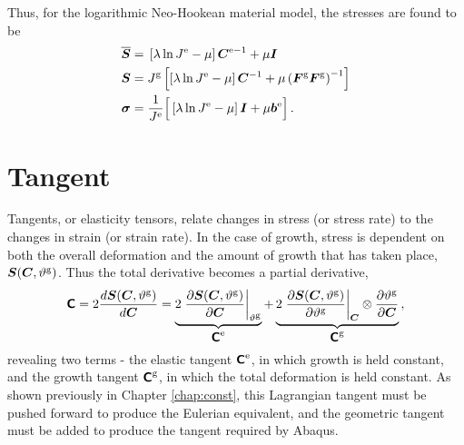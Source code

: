 \documentclass[10pt,letterpaper,oneside]{report}
\newcommand{\ten}[1]{\mbox{\boldmath $#1$}{}}
\newcommand{\tenf}[1]{\mbox{{\sffamily{\bfseries {#1}}}}}
\newcommand{\scas}[1]{\mbox{{\scriptsize{${\rm{#1}}$}}}{}}
\newcommand{\tens}[1]{\mbox{\boldmath{\scriptsize{$#1$}}}{}}
\begin{document}
\begin{itemize}
Thus, for the logarithmic Neo-Hookean material model, the stresses are found to be
\begin{align}
\overline{\ten{S}} ={}& \left[ \lambda \ln J^{\scas{e}} - \mu \right] \ten{C}^{\scas{e}-1} + \mu \ten{I} 
\\
\ten{S} ={}& J^{\scas{g}} \left[ \left[ \lambda \ln J^{\scas{e}} - \mu \right] \ten{C}^{-1} + \mu \left( \ten{F}^{\scas{g}} \ten{F}^{\scas{g}} \right)^{-1} \right] 
\\
\ten{\sigma} ={}& \frac{1}{J^{\scas{e}}} \Big[ \left[ \lambda \ln J^{\scas{e}} - \mu \right] \ten{I} + \mu \ten{b}^{\scas{e}} \Big] \, . 
\end{align}


\section{Tangent}
Tangents, or elasticity tensors, relate changes in stress (or stress rate) to the changes in strain (or strain rate).  In the case of growth, stress is dependent on both the overall deformation and the amount of growth that has taken place,
$\ten{S} (\ten{C}, \vartheta^{\scas{g}}) $. Thus the total derivative becomes a partial derivative, 
\begin{equation}
\tenf{C} = 2 \frac{d \ten{S} (\ten{C}, \vartheta^{\scas{g}}) }{d \ten{C} } 
= \underbrace{ 2 \left. \frac{ \partial \ten{S} (\ten{C}, \vartheta^{\scas{g}}) }{ \partial \ten{C} } \right|_{\vartheta^{\scas{g}}} }_{ \tenf{C}^{\scas{e}} } + \underbrace{ 2 \left. \frac{\partial \ten{S} (\ten{C}, \vartheta^{\scas{g}}) }{\partial \vartheta^{\scas{g}}} \right|_{\tens{C} } \otimes \frac{ \partial \vartheta^{\scas{g}} }{ \partial \ten{C} } }_{ \tenf{C}^{\scas{g}} } \, , 
\end{equation}
revealing two terms - the elastic tangent $\tenf{C}^{\scas{e}}$, in which growth is held constant, and the growth tangent $\tenf{C}^{\scas{g}}$, in which the total deformation is held constant.  
As shown previously in Chapter \ref{chap:const}, this Lagrangian tangent must be pushed forward to produce the Eulerian equivalent, and the geometric tangent must be added to produce the tangent required by Abaqus.  



\end{itemize}
\end{document}
